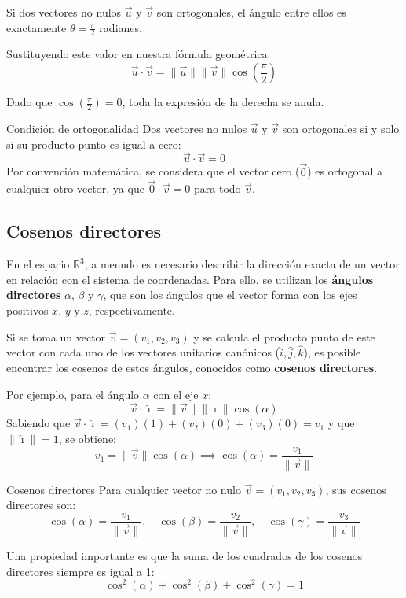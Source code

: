 Si dos vectores no nulos $\vec{u}$ y $\vec{v}$ son ortogonales, el ángulo entre ellos es exactamente $\theta = \frac{\pi}{2}$ radianes. 

Sustituyendo este valor en nuestra fórmula geométrica:
\[ \vec{u} \cdot \vec{v} = \|\vec{u}\|\|\vec{v}\|\cos\left(\frac{\pi}{2}\right) \]

Dado que $\cos(\frac{\pi}{2}) = 0$, toda la expresión de la derecha se anula.

\begin{mytheorem}{Condición de ortogonalidad}
Dos vectores no nulos $\vec{u}$ y $\vec{v}$ son ortogonales si y solo si su producto punto es igual a cero:
\[ \vec{u} \cdot \vec{v} = 0 \]
Por convención matemática, se considera que el vector cero ($\vec{0}$) es ortogonal a cualquier otro vector, ya que $\vec{0} \cdot \vec{v} = 0$ para todo $\vec{v}$.
\end{mytheorem}

\subsection{Cosenos directores}

En el espacio $\mathbb{R}^3$, a menudo es necesario describir la dirección exacta de un vector en relación con el sistema de coordenadas. Para ello, se utilizan los \textbf{ángulos directores} $\alpha$, $\beta$ y $\gamma$, que son los ángulos que el vector forma con los ejes positivos $x$, $y$ y $z$, respectivamente.

Si se toma un vector $\vec{v} = (v_1, v_2, v_3)$ y se calcula el producto punto de este vector con cada uno de los vectores unitarios canónicos ($\hat{i}, \hat{j}, \hat{k}$), es posible encontrar los cosenos de estos ángulos, conocidos como \textbf{cosenos directores}.

Por ejemplo, para el ángulo $\alpha$ con el eje $x$:
\[ \vec{v} \cdot \hat{\imath} = \|\vec{v}\|\|\hat{\imath}\|\cos(\alpha) \]
Sabiendo que $\vec{v} \cdot \hat{\imath} = (v_1)(1) + (v_2)(0) + (v_3)(0) = v_1$ y que $\|\hat{\imath}\| = 1$, se obtiene:
\[ v_1 = \|\vec{v}\|\cos(\alpha) \implies \cos(\alpha) = \frac{v_1}{\|\vec{v}\|} \]

\begin{mydefinition}{Cosenos directores}
Para cualquier vector no nulo $\vec{v} = (v_1, v_2, v_3)$, sus cosenos directores son:
\[ \cos(\alpha) = \frac{v_1}{\|\vec{v}\|}, \quad \cos(\beta) = \frac{v_2}{\|\vec{v}\|}, \quad \cos(\gamma) = \frac{v_3}{\|\vec{v}\|} \]

Una propiedad importante es que la suma de los cuadrados de los cosenos directores siempre es igual a 1:
\[ \cos^2(\alpha) + \cos^2(\beta) + \cos^2(\gamma) = 1 \]
\end{mydefinition}


